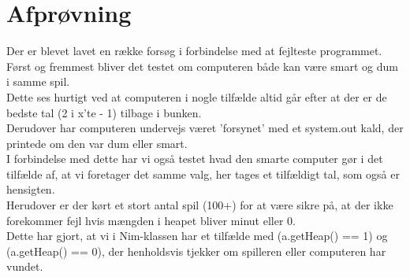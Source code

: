 \documentclass[a4paper,11pt]{article}
\begin{document}
\section*{Afprøvning}
Der er blevet lavet en række forsøg i forbindelse med at fejlteste programmet. \\
Først og fremmest bliver det testet om computeren både kan være smart og dum i samme spil. \\
Dette ses hurtigt ved at computeren i nogle tilfælde altid går efter at der er de bedste tal (2 i x'te - 1) tilbage i bunken. \\
Derudover har computeren undervejs været 'forsynet' med et system.out kald, der printede om den var dum eller smart. 
\\
I forbindelse med dette har vi også testet hvad den smarte computer gør i det tilfælde af, at vi foretager det samme valg, her tages et tilfældigt tal, som også er hensigten.
\\
Herudover er der kørt et stort antal spil (100+) for at være sikre på, at der ikke forekommer fejl hvis mængden i heapet bliver minut eller 0. \\
Dette har gjort, at vi i Nim-klassen har et tilfælde med (a.getHeap() == 1) og (a.getHeap() == 0), der henholdsvis tjekker om spilleren eller computeren har vundet.
\end{document}
